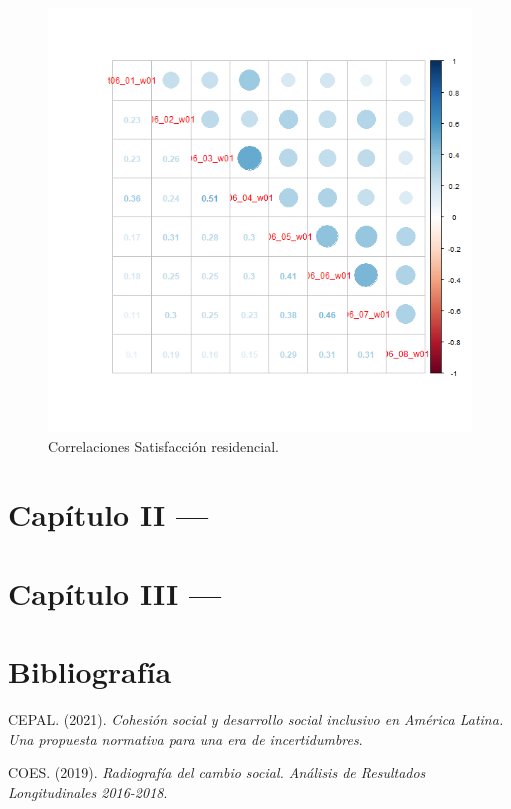 \documentclass[
  12pt,
]{book}
\begin{document}
\begin{figure}[H]

{\centering \includegraphics[width=1\linewidth,height=1\textheight]{output/graphs/satisfaccion-residencial_cor} 

}

\caption{Correlaciones Satisfacción residencial.}\label{fig:unnamed-chunk-9}
\end{figure}

\hypertarget{capuxedtulo-ii}{%
\chapter{Capítulo II ---}\label{capuxedtulo-ii}}

\hypertarget{capuxedtulo-iii}{%
\chapter{Capítulo III ---}\label{capuxedtulo-iii}}

\hypertarget{bibliografuxeda}{%
\chapter*{Bibliografía}\label{bibliografuxeda}}

\hypertarget{refs}{}
\leavevmode\hypertarget{ref-cepal_Cohesion_2021}{}%
CEPAL. (2021). \emph{Cohesión social y desarrollo social inclusivo en América Latina. Una propuesta normativa para una era de incertidumbres}.

\leavevmode\hypertarget{ref-coes_Radiografia_2019}{}%
COES. (2019). \emph{Radiografía del cambio social. Análisis de Resultados Longitudinales 2016-2018}.
\end{document}
